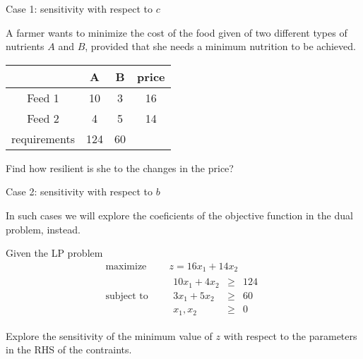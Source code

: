 \documentclass[c]{beamer}
\begin{document}
\begin{frame}{Case 1: sensitivity with respect to $c$}

  \begin{Exercise}
    A farmer wants to minimize the cost of the food given of two different types of nutrients $A$ and $B$, provided that she needs a minimum nutrition to be achieved.
    \begin{center}
    \begin{tabular}{c|c|c|c}
     & A & B & price\\
     \hline
     Feed 1 & 10 & 3 & 16\\
     Feed 2 & 4 & 5 & 14\\
     \hline
     requirements & 124 & 60 & \\
    \end{tabular}
    \end{center}

    Find how resilient is she to the changes in the price?

  \end{Exercise}
\end{frame}

\begin{frame}{Case 2: sensitivity with respect to $b$}

  In such cases we will explore the coeficients of the objective function in the dual problem, instead.

  \begin{Exercise}
    Given the LP problem
    \begin{equation*}
      \begin{aligned}
        \text{maximize } \quad & z = 16x_1+14x_2 \\
        \text{subject to }\quad &
        \begin{array}{rcl}
          10x_1 + 4x_2 &\geq &124 \\
          3x_1 + 5x_2 &\geq &60 \\
          x_1,x_2 &\geq& 0
        \end{array}
      \end{aligned}
    \end{equation*}

    Explore the sensitivity of the minimum value of $z$ with respect to the parameters in the RHS of the contraints.

  \end{Exercise}

\end{frame}
\end{document}
